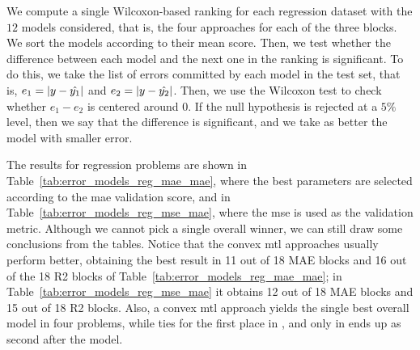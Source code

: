 %
We compute a single Wilcoxon-based ranking for each regression dataset with the $12$ models considered, that is, the four approaches for each of the three blocks. We sort the models according to their mean score. Then, we test whether the difference between each model and the next one in the ranking is significant. To do this, we take the list of errors committed by each model in the test set, that is, $e_1 = \left|y - \hat{y_1}\right|$ and $e_2 = \left|y - \hat{y_2}\right|$. Then, we use the Wilcoxon test to check whether $e_1 - e_2$ is centered around 0.
If the null hypothesis is rejected at a $5\%$ level, then we say that the difference is significant, and we take as better the model with smaller error.
%
%

The results for regression problems are shown in Table~\ref{tab:error_models_reg_mae_mae}, where the best parameters are selected according to the \acrshort{mae} validation score, and in Table~\ref{tab:error_models_reg_mse_mae}, where the \acrshort{mse} is used as the validation metric.
%
Although we cannot pick a single overall winner, we can still draw some conclusions from the tables. Notice that the convex \acrshort{mtl} approaches usually perform better, obtaining the best result in 11 out of 18 MAE blocks and 16 out of the 18 R2 blocks of Table~\ref{tab:error_models_reg_mae_mae}; in Table~\ref{tab:error_models_reg_mse_mae} it obtains 12 out of 18 MAE blocks and 15 out of 18 R2 blocks.
Also, a convex \acrshort{mtl} approach yields the single best overall model in four problems, while ties for the first place in , and only in  ends up as second after the  model.


